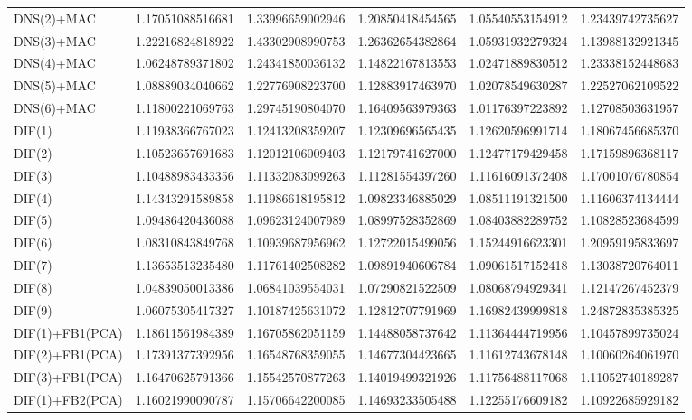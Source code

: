 \begin{table}[htb]
\begin{adjustbox}{totalheight=\baselineskip}
\begin{tabular}{lSSSSS}
DNS(2)+MAC & 1.17051088516681 & 1.33996659002946 & 1.20850418454565 & 1.05540553154912 & 1.23439742735627 \\ 
DNS(3)+MAC & 1.22216824818922 & 1.43302908990753 & 1.26362654382864 & 1.05931932279324 & 1.13988132921345 \\ 
DNS(4)+MAC & 1.06248789371802 & 1.24341850036132 & 1.14822167813553 & 1.02471889830512 & 1.23338152448683 \\ 
DNS(5)+MAC & 1.08889034040662 & 1.22776908223700 & 1.12883917463970 & 1.02078549630287 & 1.22527062109522 \\ 
DNS(6)+MAC & 1.11800221069763 & 1.29745190804070 & 1.16409563979363 & 1.01176397223892 & 1.12708503631957 \\ 
DIF(1) & 1.11938366767023 & 1.12413208359207 & 1.12309696565435 & 1.12620596991714 & 1.18067456685370 \\ 
DIF(2) & 1.10523657691683 & 1.12012106009403 & 1.12179741627000 & 1.12477179429458 & 1.17159896368117 \\ 
DIF(3) & 1.10488983433356 & 1.11332083099263 & 1.11281554397260 & 1.11616091372408 & 1.17001076780854 \\ 
DIF(4) & 1.14343291589858 & 1.11986618195812 & 1.09823346885029 & 1.08511191321500 & 1.11606374134444 \\ 
DIF(5) & 1.09486420436088 & 1.09623124007989 & 1.08997528352869 & 1.08403882289752 & 1.10828523684599 \\ 
DIF(6) & 1.08310843849768 & 1.10939687956962 & 1.12722015499056 & 1.15244916623301 & 1.20959195833697 \\ 
DIF(7) & 1.13653513235480 & 1.11761402508282 & 1.09891940606784 & 1.09061517152418 & 1.13038720764011 \\ 
DIF(8) & 1.04839050013386 & 1.06841039554031 & 1.07290821522509 & 1.08068794929341 & 1.12147267452379 \\ 
DIF(9) & 1.06075305417327 & 1.10187425631072 & 1.12812707791969 & 1.16982439999818 & 1.24872835385325 \\ 
DIF(1)+FB1(PCA) & 1.18611561984389 & 1.16705862051159 & 1.14488058737642 & 1.11364444719956 & 1.10457899735024 \\ 
DIF(2)+FB1(PCA) & 1.17391377392956 & 1.16548768359055 & 1.14677304423665 & 1.11612743678148 & 1.10060264061970 \\ 
DIF(3)+FB1(PCA) & 1.16470625791366 & 1.15542570877263 & 1.14019499321926 & 1.11756488117068 & 1.11052740189287 \\ 
DIF(1)+FB2(PCA) & 1.16021990090787 & 1.15706642200085 & 1.14693233505488 & 1.12255176609182 & 1.10922685929182 \\ 

\end{tabular}
\end{adjustbox}
\end{table}
